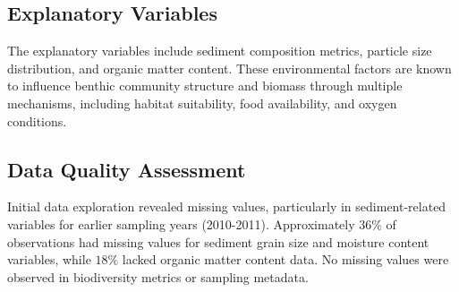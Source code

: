 \documentclass[12pt]{article}
\begin{document}
\subsection{Explanatory Variables}

\qquad The explanatory variables include sediment composition metrics, particle
size distribution, and organic matter content. These environmental factors are
known to influence benthic community structure and biomass through multiple
mechanisms, including habitat suitability, food availability, and oxygen
conditions.

\subsection{Data Quality Assessment}

\qquad Initial data exploration revealed missing values, particularly in
sediment-related variables for earlier sampling years (2010-2011). Approximately
$36\%$ of observations had missing values for sediment grain size and moisture
content variables, while $18\%$ lacked organic matter content data. No missing
values were observed in biodiversity metrics or sampling metadata.
\end{document}
